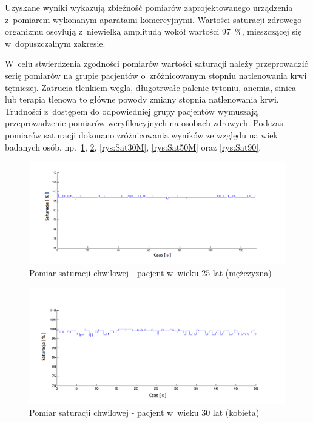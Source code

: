 Uzyskane wyniki wykazują zbieżność pomiarów zaprojektowanego urządzenia z~pomiarem wykonanym aparatami komercyjnymi. Wartości saturacji zdrowego organizmu
oscylują z~niewielką amplitudą wokół wartości 97~\%, mieszczącej się w~dopuszczalnym zakresie.

W~celu stwierdzenia zgodności pomiarów wartości saturacji należy przeprowadzić serię pomiarów na grupie pacjentów o~zróżnicowanym stopniu
natlenowania krwi tętniczej. Zatrucia tlenkiem węgla, długotrwałe palenie tytoniu, anemia, sinica lub terapia tlenowa to główne powody 
zmiany stopnia natlenowania krwi. Trudności z~dostępem do odpowiedniej grupy pacjentów wymuszają przeprowadzenie pomiarów weryfikacyjnych 
na osobach zdrowych. Podczas pomiarów saturacji dokonano zróżnicowania wyników ze względu na wiek badanych osób, np.~\ref{rys:Sat25}, 
\ref{rys:Sat30K}, \ref{rys:Sat30M}, \ref{rys:Sat50M} oraz \ref{rys:Sat90}.\\
\begin{figure}[!h]
	\centerline{\includegraphics[scale = 0.63]{graphic/Sat25}}
	\caption{Pomiar saturacji chwilowej - pacjent w~wieku 25 lat (mężczyzna)}
	\label{rys:Sat25}
\end{figure}
\newpage
\begin{figure}[!h]
	\centerline{\includegraphics[scale = 0.63]{graphic/Sat30K}}
	\caption{Pomiar saturacji chwilowej - pacjent w~wieku 30 lat (kobieta)}
	\label{rys:Sat30K}
\end{figure}
